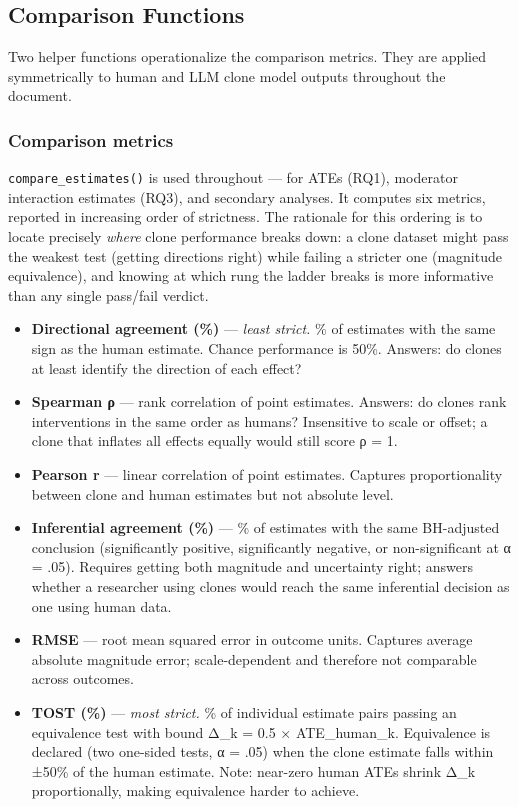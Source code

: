 \documentclass[
  letterpaper,
  DIV=11,
  numbers=noendperiod]{scrartcl}
\providecommand{\tightlist}{%
  \setlength{\itemsep}{0pt}\setlength{\parskip}{0pt}}
\begin{document}
\subsection{Comparison Functions}\label{comparison-functions}

Two helper functions operationalize the comparison metrics. They are
applied symmetrically to human and LLM clone model outputs throughout
the document.

\subsubsection{Comparison metrics}\label{comparison-metrics}

\texttt{compare\_estimates()} is used throughout --- for ATEs (RQ1),
moderator interaction estimates (RQ3), and secondary analyses. It
computes six metrics, reported in increasing order of strictness. The
rationale for this ordering is to locate precisely \emph{where} clone
performance breaks down: a clone dataset might pass the weakest test
(getting directions right) while failing a stricter one (magnitude
equivalence), and knowing at which rung the ladder breaks is more
informative than any single pass/fail verdict.

\begin{itemize}
\tightlist
\item
  \textbf{Directional agreement (\%)} --- \emph{least strict.} \% of
  estimates with the same sign as the human estimate. Chance performance
  is 50\%. Answers: do clones at least identify the direction of each
  effect?
\item
  \textbf{Spearman ρ} --- rank correlation of point estimates. Answers:
  do clones rank interventions in the same order as humans? Insensitive
  to scale or offset; a clone that inflates all effects equally would
  still score ρ = 1.
\item
  \textbf{Pearson r} --- linear correlation of point estimates. Captures
  proportionality between clone and human estimates but not absolute
  level.
\item
  \textbf{Inferential agreement (\%)} --- \% of estimates with the same
  BH-adjusted conclusion (significantly positive, significantly
  negative, or non-significant at α = .05). Requires getting both
  magnitude and uncertainty right; answers whether a researcher using
  clones would reach the same inferential decision as one using human
  data.
\item
  \textbf{RMSE} --- root mean squared error in outcome units. Captures
  average absolute magnitude error; scale-dependent and therefore not
  comparable across outcomes.
\item
  \textbf{TOST (\%)} --- \emph{most strict.} \% of individual estimate
  pairs passing an equivalence test with bound Δ\_k = 0.5 ×
  \textbar ATE\_human\_k\textbar. Equivalence is declared (two one-sided
  tests, α = .05) when the clone estimate falls within ±50\% of the
  human estimate. Note: near-zero human ATEs shrink Δ\_k proportionally,
  making equivalence harder to achieve.
\end{itemize}
\end{document}
